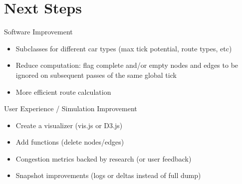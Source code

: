 \section{Next Steps}

    \frame{\sectionpage}
    
    \begin{frame}{Software Improvement}
        \begin{itemize}
            \item Subclasses for different car types (max tick potential, route types, etc)
            \item Reduce computation:  flag complete and/or empty nodes and edges to be ignored on subsequent passes of the same global tick 
            \item More efficient route calculation
        \end{itemize}
    \end{frame}     

    \begin{frame}{User Experience / Simulation Improvement}
        \begin{itemize}
            \item Create a visualizer (vis.js or D3.js)
            \item Add functions (delete nodes/edges)
            \item Congestion metrics backed by research (or user feedback)
            \item Snapshot improvements (logs or deltas instead of full dump)
        \end{itemize}
    \end{frame}    